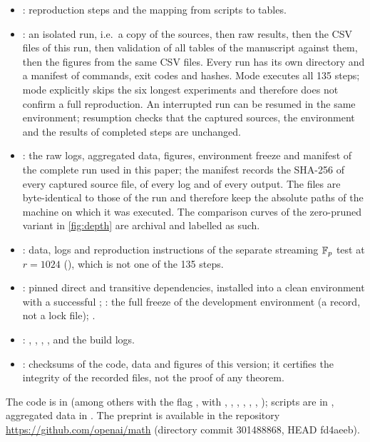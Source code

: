 \documentclass[11pt]{article}
\theoremstyle{plain}
\begin{document}
\begin{itemize}
\item {}: reproduction steps and the mapping from scripts to tables.
\item {}: an isolated run, i.e.\ a copy of the sources, then raw results, then the CSV files of this run, then validation of all tables of the manuscript against them, then the figures from the same CSV files. Every run has its own directory and a manifest of commands, exit codes and hashes. Mode  executes all 135 steps; mode  explicitly skips the six longest experiments and therefore does not confirm a full reproduction. An interrupted run can be resumed in the same environment; resumption checks that the captured sources, the environment and the results of completed steps are unchanged.
\item {}: the raw logs, aggregated data, figures, environment freeze and manifest of the complete run used in this paper; the manifest records the SHA-256 of every captured source file, of every log and of every output. The files are byte-identical to those of the run and therefore keep the absolute paths of the machine on which it was executed. The comparison curves of the zero-pruned variant in \cref{fig:depth} are archival and labelled as such.
\item {}: data, logs and reproduction instructions of the separate streaming $\mathbb{F}_p$ test at $r=1024$ (), which is not one of the 135 steps.
\item {}: pinned direct and transitive dependencies, installed into a clean environment with a successful ; : the full freeze of the development environment (a record, not a lock file); .
\item {}: , , , ,  and the build logs.
\item {}: checksums of the code, data and figures of this version; it certifies the integrity of the recorded files, not the proof of any theorem.
\end{itemize}
The code is in  (among others  with the flag ,  with , , , , , , ); scripts are in , aggregated data in . The preprint is available in the repository \url{https://github.com/openai/math} (directory commit 301488868, HEAD fd4aeeb).
\end{document}
